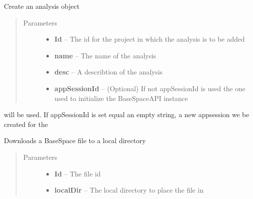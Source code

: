 \documentclass[letterpaper,10pt,english]{sphinxmanual}
\begin{document}
\begin{fulllineitems}

\begin{fulllineitems}
\label{Available modules:BaseSpacePy.api.BaseSpaceAPI.BaseSpaceAPI.createAppResult}
Create an analysis object
\begin{quote}\begin{description}
\item[{Parameters}] \leavevmode\begin{itemize}
\item {} 
\textbf{Id} -- The id for the project in which the analysis is to be added

\item {} 
\textbf{name} -- The name of the analysis

\item {} 
\textbf{desc} -- A describtion of the analysis

\item {} 
\textbf{appSessionId} -- (Optional) If not appSessionId is used the one used to initialize the BaseSpaceAPI instance

\end{itemize}

\end{description}\end{quote}

will be used. If appSessionId is set equal an empty string, a new appsession we be created for the

\end{fulllineitems}


\begin{fulllineitems}
\label{Available modules:BaseSpacePy.api.BaseSpaceAPI.BaseSpaceAPI.fileDownload}
Downloads a BaseSpace file to a local directory
\begin{quote}\begin{description}
\item[{Parameters}] \leavevmode\begin{itemize}
\item {} 
\textbf{Id} -- The file id

\item {} 
\textbf{localDir} -- The local directory to place the file in


\end{itemize}
\end{description}
\end{quote}
\end{fulllineitems}
\end{fulllineitems}
\end{document}
